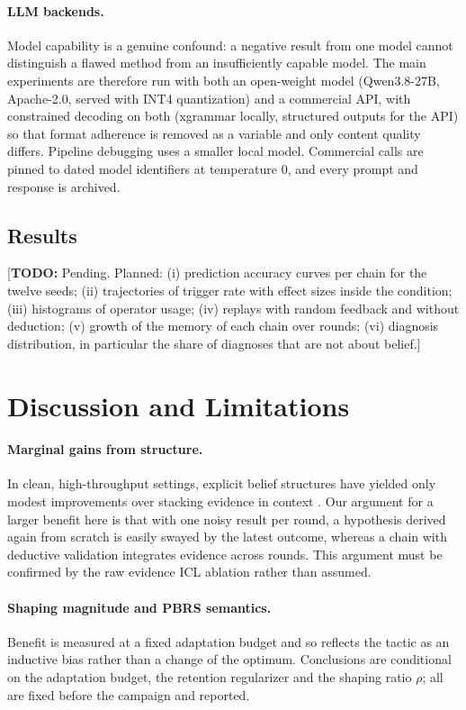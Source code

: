 \documentclass[11pt]{article}
\newcommand{\todo}[1]{\textcolor{BrickRed}{[\textbf{TODO:} #1]}}
\begin{document}
\paragraph{LLM backends.}
Model capability is a genuine confound: a negative result from one model cannot distinguish a flawed method from an insufficiently capable model.
The main experiments are therefore run with both an open-weight model (Qwen3.8-27B, Apache-2.0, served with INT4 quantization) and a commercial API, with constrained decoding on both (xgrammar locally, structured outputs for the API) so that format adherence is removed as a variable and only content quality differs.
Pipeline debugging uses a smaller local model.
Commercial calls are pinned to dated model identifiers at temperature 0, and every prompt and response is archived.

\subsection{Results}
\todo{Pending.
Planned: (i) prediction accuracy curves per chain for the twelve seeds; (ii) trajectories of trigger rate with effect sizes inside the condition; (iii) histograms of operator usage; (iv) replays with random feedback and without deduction; (v) growth of the memory of each chain over rounds; (vi) diagnosis distribution, in particular the share of diagnoses that are not about belief.}

\section{Discussion and Limitations}
\label{sec:discussion}

\paragraph{Marginal gains from structure.}
In clean, high-throughput settings, explicit belief structures have yielded only modest improvements over stacking evidence in context \citep{labloop2026}.
Our argument for a larger benefit here is that with one noisy result per round, a hypothesis derived again from scratch is easily swayed by the latest outcome, whereas a chain with deductive validation integrates evidence across rounds.
This argument must be confirmed by the raw evidence ICL ablation rather than assumed.

\paragraph{Shaping magnitude and PBRS semantics.}
Benefit is measured at a fixed adaptation budget and so reflects the tactic as an inductive bias rather than a change of the optimum.
Conclusions are conditional on the adaptation budget, the retention regularizer and the shaping ratio $\rho$; all are fixed before the campaign and reported.
\end{document}
